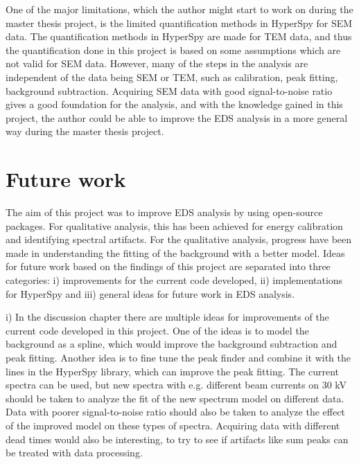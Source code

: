 One of the major limitations, which the author might start to work on during the master thesis project, is the limited quantification methods in HyperSpy for SEM data.
The quantification methods in HyperSpy are made for TEM data, and thus the quantification done in this project is based on some assumptions which are not valid for SEM data.
However, many of the steps in the analysis are independent of the data being SEM or TEM, such as calibration, peak fitting, background subtraction.
Acquiring SEM data with good signal-to-noise ratio gives a good foundation for the analysis, and with the knowledge gained in this project, the author could be able to improve the EDS analysis in a more general way during the master thesis project.













\section{Future work}
\label{sec:futurework}


The aim of this project was to improve EDS analysis by using open-source packages.
For qualitative analysis, this has been achieved for energy calibration and identifying spectral artifacts.
For the qualitative analysis, progress have been made in understanding the fitting of the background with a better model.
Ideas for future work based on the findings of this project are separated into three categories: i) improvements for the current code developed, ii) implementations for HyperSpy and iii) general ideas for future work in EDS analysis.




i) In the discussion chapter there are multiple ideas for improvements of the current code developed in this project.
One of the ideas is to model the background as a spline, which would improve the background subtraction and peak fitting.
Another idea is to fine tune the peak finder and combine it with the lines in the HyperSpy library, which can improve the peak fitting.
The current spectra can be used, but new spectra with e.g. different beam currents on 30 kV should be taken to analyze the fit of the new spectrum model on different data.
Data with poorer signal-to-noise ratio should also be taken to analyze the effect of the improved model on these types of spectra.
Acquiring data with different dead times would also be interesting, to try to see if artifacts like sum peaks can be treated with data processing.



